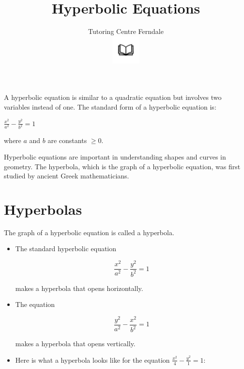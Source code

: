 \documentclass[12pt]{article}
\title{\textbf{Hyperbolic Equations}}\\
\author{Tutoring Centre Ferndale\\
\includegraphics[width=4em]{ApS_logo.png}}
\date{}
\begin{document}
\maketitle

A hyperbolic equation is similar to a quadratic equation but involves two variables instead of one. The standard form of a hyperbolic equation is:

\begin{center}
\Large{$\frac{x^2}{a^2} - \frac{y^2}{b^2} = 1$}\\
\end{center}

\begin{center}
where \(a\) and \(b\) are constants $\geq0$.\\
\end{center}

Hyperbolic equations are important in understanding shapes and curves in geometry. The hyperbola, which is the graph of a hyperbolic equation, was first studied by ancient Greek mathematicians.\\

\newpage

\section*{Hyperbolas}
The graph of a hyperbolic equation is called a hyperbola.

\begin{itemize}
\item The standard hyperbolic equation

$$\frac{x^2}{a^2} - \frac{y^2}{b^2} = 1$$

makes a hyperbola that opens horizontally.

\item The equation

$$\frac{y^2}{a^2}-\frac{x^2}{b^2}=1$$

makes a hyperbola that opens vertically.

\item Here is what a hyperbola looks like for the equation \(\frac{x^2}{4} - \frac{y^2}{1} = 1\):
\end{itemize}

\begin{center}
\end{center}
\end{document}
